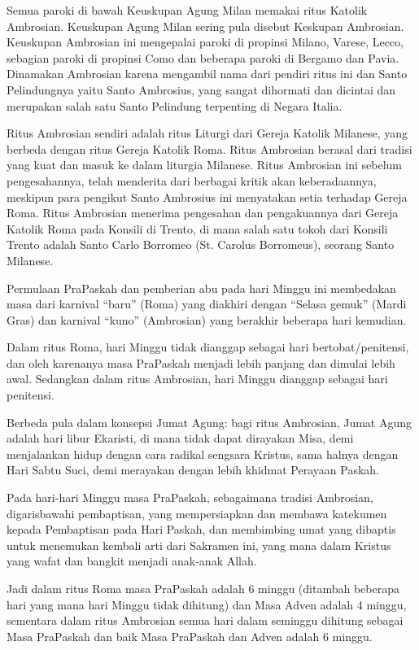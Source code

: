 Semua paroki di bawah Keuskupan Agung Milan memakai ritus Katolik Ambrosian. Keuskupan Agung Milan sering pula disebut Keskupan Ambrosian. Keuskupan Ambrosian ini mengepalai paroki di propinsi Milano, Varese, Lecco, sebagian paroki di propinsi Como dan beberapa paroki di Bergamo dan Pavia. Dinamakan Ambrosian karena mengambil nama dari pendiri ritus ini dan Santo Pelindungnya yaitu Santo Ambrosius, yang sangat dihormati dan dicintai dan merupakan salah satu Santo Pelindung terpenting di Negara Italia.

Ritus Ambrosian sendiri adalah ritus Liturgi dari Gereja Katolik Milanese, yang berbeda dengan ritus Gereja Katolik Roma. Ritus Ambrosian berasal dari tradisi yang kuat dan masuk ke dalam liturgia Milanese. Ritus Ambrosian ini sebelum pengesahannya, telah menderita dari berbagai kritik akan keberadaannya, meskipun para pengikut Santo Ambrosius ini menyatakan setia terhadap Gereja Roma. Ritus Ambrosian menerima pengesahan dan pengakuannya dari Gereja Katolik Roma pada Konsili di Trento, di mana salah satu tokoh dari Konsili Trento adalah Santo Carlo Borromeo (St. Carolus Borromeus), seorang Santo Milanese.

Permulaan PraPaskah dan pemberian abu pada hari Minggu ini membedakan masa dari karnival ``baru'' (Roma) yang diakhiri dengan ``Selasa gemuk'' (Mardi Gras) dan karnival ``kuno'' (Ambrosian) yang berakhir beberapa hari kemudian.

Dalam ritus Roma, hari Minggu tidak dianggap sebagai hari bertobat/penitensi, dan oleh karenanya masa PraPaskah menjadi lebih panjang dan dimulai lebih awal. Sedangkan dalam ritus Ambrosian, hari Minggu dianggap sebagai hari penitensi.

Berbeda pula dalam konsepsi Jumat Agung: bagi ritus Ambrosian, Jumat Agung adalah hari libur Ekaristi, di mana tidak dapat dirayakan Misa, demi menjalankan hidup dengan cara radikal sengsara Kristus, sama halnya dengan Hari Sabtu Suci, demi merayakan dengan lebih khidmat Perayaan Paskah.

Pada hari-hari Minggu masa PraPaskah, sebagaimana tradisi Ambrosian, digarisbawahi pembaptisan, yang mempersiapkan dan membawa katekumen kepada Pembaptisan pada Hari Paskah, dan membimbing umat yang dibaptis untuk menemukan kembali arti dari Sakramen ini, yang mana dalam Kristus yang wafat dan bangkit menjadi anak-anak Allah.

Jadi dalam ritus Roma masa PraPaskah adalah 6 minggu (ditambah beberapa hari yang mana hari Minggu tidak dihitung) dan Masa Adven adalah 4 minggu, sementara dalam ritus Ambrosian semua hari dalam seminggu dihitung sebagai Masa PraPaskah dan baik Masa PraPaskah dan Adven adalah 6 minggu.

